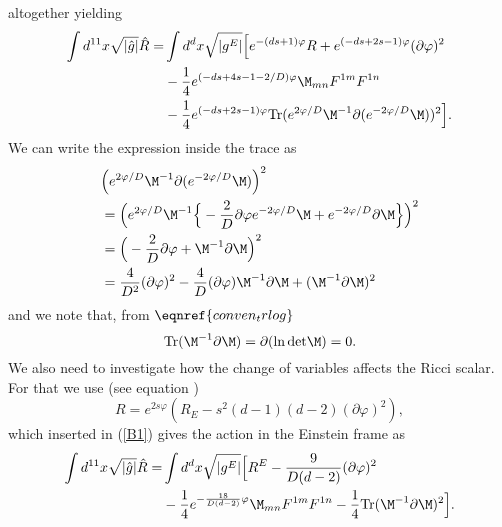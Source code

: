 altogether yielding
\begin{align}
\int d^{11}x \sqrt{|\hat{g}|} \hat{R} =& \int d^dx \sqrt{|g^E|}\Big{[}e^{-(ds+1)\varphi}R + e^{(-ds+2s-1)\varphi}(\partial \varphi)^2 \nonumber \\
&-{1 \over 4}e^{(-ds+4s-1-2/D)\varphi}\M_{mn}F^{1m}F^{1n} \nonumber \\
&-{1 \over 4}e^{(-ds+2s-1)\varphi} \mbox{Tr}(e^{2\varphi/D}\M^{-1} \partial (e^{-2\varphi/D}\M))^2\Big{]}.
\label{B1}
\end{align}
We can write the expression inside the trace as
\begin{align}
&\Big{(}e^{2\varphi/D}\M^{-1} \partial (e^{-2\varphi/D}\M)\Big{)}^2 \nonumber \\
&=\Big{(}e^{2\varphi/D}\M^{-1}\Big\{ -\frac{2}{D}\partial \varphi e^{-2\varphi/D}\M + e^{- 2\varphi/D } \partial \M\Big\}\Big{)}^2 \nonumber \\
&=\Big{(}-\frac{2}{D}\partial \varphi + \M^{-1} \partial \M\Big{)}^2 \nonumber \\
&=\frac{4}{D^2}(\partial \varphi)^2 - \frac{4}{D}(\partial \varphi)\M^{-1}\partial \M +(\M^{-1}\partial \M)^2
\end{align}
and we note that, from $\eqnref{conven_trlog}$
\begin{equation}
\mbox{Tr}(\M^{-1} \partial \M)=\partial(\ln \mbox{det}\M)=0.
\end{equation}
We also need to investigate how the change of variables affects the Ricci scalar. For that we use (see equation )
\begin{equation}
R = e^{2s\varphi}(R_E-s^2(d-1)(d-2)(\partial \varphi)^2),
\end{equation}
which inserted in (\ref{B1}) gives the action in the Einstein frame as
\begin{align}
\int d^{11}x \sqrt{|\hat{g}|} \hat{R} =& \int d^dx \sqrt{|g^E|}\Big{[}R^E - {9 \over D(d-2)}(\partial \varphi)^2 \nonumber \\
&-{1 \over 4}e^{-{18 \over D(d-2)}\varphi }\M_{mn}F^{1m}F^{1n}-{1 \over 4}\mbox{Tr}(\M^{-1}\partial \M)^2\Big{]}.
\label{B2}
\end{align}

